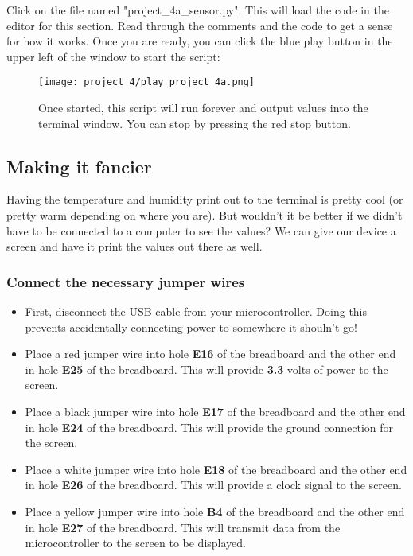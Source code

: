 Click on the file named "project\_4a\_sensor.py". This will load the code in the editor for this section. Read through the comments
and the code to get a sense for how it works. Once you are ready, you can click the blue play button in the upper left of the window to start the script:
\begin{figure}[H]
    \centering
    \texttt{[image: project\_4/play\_project\_4a.png]}
    \caption{Once started, this script will run forever and output values into the terminal window. You can stop by pressing the red stop button.}
\end{figure}

\subsection{Making it fancier}
Having the temperature and humidity print out to the terminal is pretty cool (or pretty warm depending on where you are).
But wouldn't it be better if we didn't have to be connected to a computer to see the values? We can give our device a screen and have it print the values out there as well.

\subsubsection{Connect the necessary jumper wires}
\begin{itemize}
    \item First, disconnect the USB cable from your microcontroller. Doing this prevents accidentally connecting power to somewhere it shouln't go!
    \item Place a red jumper wire into hole \textbf{E16} of the breadboard and the other end in
    hole \textbf{E25} of the breadboard. This will provide \textbf{3.3} volts of power to the screen.
    \item Place a black jumper wire into hole \textbf{E17} of the breadboard and the other end
    in hole \textbf{E24} of the breadboard. This will provide the ground connection for the screen.
    \item Place a white jumper wire into hole \textbf{E18} of the breadboard and the other end
    in hole \textbf{E26} of the breadboard. This will provide a clock signal to the screen.
    \item Place a yellow jumper wire into hole \textbf{B4} of the breadboard and the other
    end in hole \textbf{E27} of the breadboard. This will transmit data from the microcontroller to the screen to be displayed.
\end{itemize}

